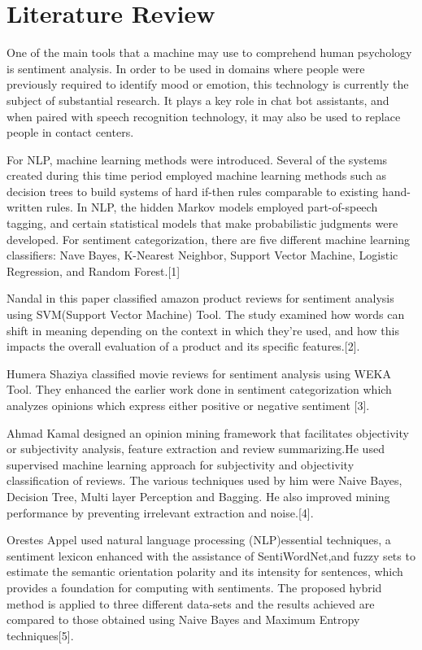 \section{Literature Review}
One of the main tools that a machine may use to comprehend human psychology is sentiment analysis. In order to be used in domains where people were previously required to identify mood or emotion, this technology is currently the subject of substantial research. It plays a key role in chat bot assistants, and when paired with speech recognition technology, it may also be used to replace people in contact centers. 

\par For NLP, machine learning methods were introduced. Several of the systems created during this time period employed machine learning methods such as decision trees to build systems of hard if-then rules comparable to existing hand-written rules. In NLP, the hidden Markov models employed part-of-speech tagging, and certain statistical models that make probabilistic judgments were developed. For sentiment categorization, there are five different machine learning classifiers: Nave Bayes, K-Nearest Neighbor, Support Vector Machine, Logistic Regression, and Random Forest.[1]

Nandal in this paper classified amazon product reviews for sentiment analysis using SVM(Support Vector Machine) Tool. The study examined how words can shift in meaning depending on the context in which they're used, and how this impacts the overall evaluation of a product and its specific features.[2].

 \par Humera Shaziya classified movie reviews for sentiment analysis using WEKA Tool. They enhanced the earlier work done in sentiment categorization which analyzes opinions which express either positive or negative sentiment
[3].

Ahmad Kamal designed an opinion mining framework that facilitates objectivity or subjectivity analysis, feature extraction and review summarizing.He used supervised machine learning approach for subjectivity and objectivity classification of reviews. The various techniques used by him were Naive Bayes, Decision Tree, Multi layer Perception and Bagging. He also improved mining performance by preventing irrelevant extraction and noise.[4].\par

Orestes Appel used natural language processing (NLP)essential techniques, a sentiment lexicon enhanced with the assistance of SentiWordNet,and fuzzy sets to estimate the semantic orientation polarity and its intensity for sentences,
which provides a foundation for computing with sentiments. The proposed hybrid method is applied to three different data-sets and the results achieved are compared to those obtained
using Naive Bayes and Maximum Entropy techniques[5].
